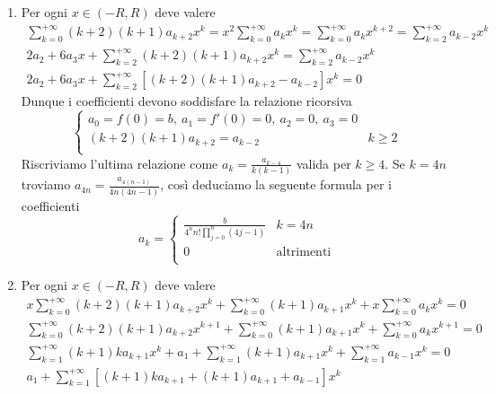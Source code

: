 \begin{enumerate}[label = (\roman*)]
\item Per ogni $ x \in (-R, R) $ deve valere
  \begin{gather*}
    \sum_{k = 0}^{+\infty} (k + 2)(k + 1) a_{k + 2} x^{k} = x^2 \sum_{k = 0}^{+\infty} a_k x^k = \sum_{k = 0}^{+\infty} a_k x^{k + 2} = \sum_{k = 2}^{+\infty} a_{k - 2} x^k \\
    2 a_2 + 6 a_3 x + \sum_{k = 2}^{+\infty} (k + 2)(k + 1) a_{k + 2} x^{k} = \sum_{k = 2}^{+\infty} a_{k - 2} x^k \\
    2 a_2 + 6 a_3 x + \sum_{k = 2}^{+\infty} \left[(k + 2)(k + 1) a_{k + 2} - a_{k - 2}\right] x^{k} = 0
  \end{gather*}
  Dunque i coefficienti devono soddisfare la relazione ricorsiva
  \begin{equation*}
    \begin{cases}
      a_0 = f(0) = b, \ a_1 = f'(0) = 0, \ a_2 = 0, \ a_3 = 0 \\
      (k + 2) (k + 1) a_{k + 2} = a_{k - 2} & k \geq 2 \\
    \end{cases}
  \end{equation*}
  Riscriviamo l'ultima relazione come $ a_k = \frac{a_{k - 4}}{k (k - 1)} $ valida per $ k \geq 4 $. Se $ k = 4n $ troviamo $ a_{4n} = \frac{a_{4(n - 1)}}{4 n (4n - 1)} $, così deduciamo la seguente formula per i coefficienti
  \begin{equation*}
    a_k =
    \begin{cases}
      \frac{b}{4^{n} n! \prod_{j = 0}^{n} (4j - 1)} & k = 4n \\
      0 & \text{altrimenti} \\
    \end{cases}
  \end{equation*}
\item Per ogni $ x \in (-R, R) $ deve valere
  \begin{gather*}
    x \sum_{k = 0}^{+\infty} (k + 2)(k + 1) a_{k + 2} x^{k} + \sum_{k = 0}^{+\infty} (k + 1) a_{k +1 } x^k + x \sum_{k = 0}^{+\infty} a_k x^k = 0 \\
    \sum_{k = 0}^{+\infty} (k + 2)(k + 1) a_{k + 2} x^{k + 1} + \sum_{k = 0}^{+\infty} (k + 1) a_{k +1 } x^k + \sum_{k = 0}^{+\infty} a_k x^{k + 1} = 0 \\
    \sum_{k = 1}^{+\infty} (k + 1)k a_{k + 1} x^{k} + a_1 + \sum_{k = 1}^{+\infty} (k + 1) a_{k +1 } x^k + \sum_{k = 1}^{+\infty} a_{k - 1} x^{k} = 0 \\
    a_1 + \sum_{k = 1}^{+\infty} \left[(k + 1)k a_{k + 1} + (k + 1) a_{k + 1} + a_{k - 1}\right] x^{k}

\end{gather*}
\end{enumerate}
